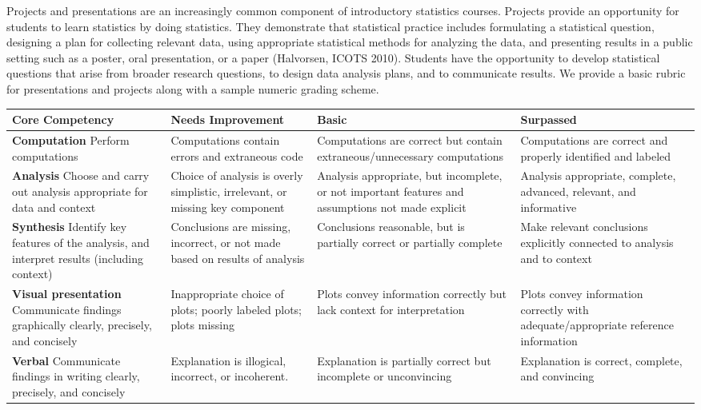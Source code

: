 Projects and presentations are an increasingly 
common component of introductory statistics courses.  
 Projects provide an opportunity for 
students to learn statistics by doing statistics.  They demonstrate that statistical practice includes
formulating a statistical question, designing a plan for collecting relevant data, using appropriate
statistical methods for analyzing the data, and presenting results in a public setting such as a poster,
oral presentation, or a paper (Halvorsen, ICOTS 2010). 
Students have the opportunity to 
develop statistical questions that arise from broader research questions, to design data
analysis plans, and to communicate results.
We provide a basic rubric for presentations and projects along with a sample numeric grading scheme.

\begin{tabular}{| p{4cm} | p{4cm} | p{4cm} | p{4cm} |}
\hline
 Core Competency &  Needs Improvement & Basic & Surpassed \\
 \hline
 \hline		
\textbf{Computation}
Perform computations &
Computations contain errors and extraneous code &
Computations are correct but contain extraneous/unnecessary computations	&
Computations are correct and properly identified and labeled \\
 \hline
\textbf{Analysis}
Choose and carry out analysis appropriate for data and context	 &
Choice of analysis is overly simplistic, irrelevant, or missing key component &
Analysis appropriate, but incomplete, or not important features and assumptions not made explicit &
 Analysis appropriate, complete, advanced, relevant, and informative \\
  \hline
\textbf{Synthesis}
Identify key features of the analysis, and interpret results (including context) &
 Conclusions are missing, incorrect, or not made based on results of analysis &
 Conclusions reasonable, but is partially correct or partially complete &
 Make relevant conclusions explicitly connected to analysis and to context \\
  \hline
\textbf{Visual presentation}
Communicate findings graphically clearly, precisely, and concisely  & 
 Inappropriate choice of plots; poorly labeled plots; plots missing &
 Plots convey information correctly but lack context for interpretation &
 Plots convey information correctly with adequate/appropriate reference information \\
  \hline
\textbf{Verbal}
Communicate findings in writing clearly, precisely, and concisely &
 Explanation is illogical, incorrect, or incoherent. &
 Explanation is partially correct but incomplete or unconvincing	&
 Explanation is correct, complete, and convincing \\
 \hline
 \end{tabular}


